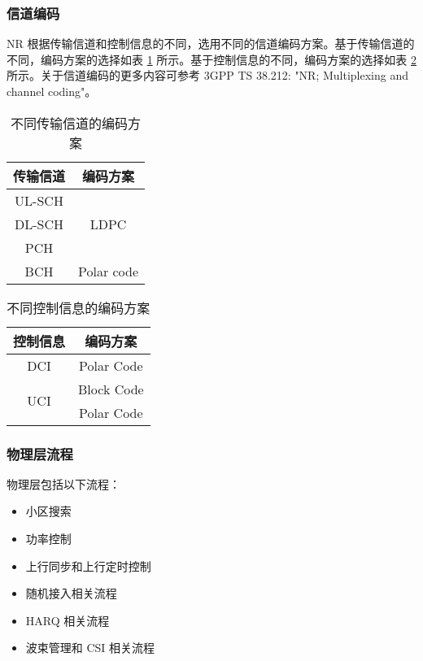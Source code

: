 \documentclass[cn,hazy,blue,14pt,screen,device=normal]{elegantnote}
\begin{document}
\subsubsection{信道编码}
NR 根据传输信道和控制信息的不同，选用不同的信道编码方案。基于传输信道的不同，编码方案的选择如表 \ref{ChannelCodingBasedOnTrCHs} 所示。基于控制信息的不同，编码方案的选择如表 \ref{ChannelCodingBasedOnControlInfo} 所示。关于信道编码的更多内容可参考 3GPP TS 38.212: "NR; Multiplexing and channel coding"。

\begin{table}[!hbp]
	\centering
	\setlength{\tabcolsep}{25mm}
	\begin{tabular}{|c|c|}
	\hline
	传输信道   & 编码方案                  \\ \hline
	UL-SCH & \multirow{3}{*}{LDPC} \\ \cline{1-1}
	DL-SCH &                       \\ \cline{1-1}
	PCH    &                       \\ \hline
	BCH    & Polar code            \\ \hline
	\end{tabular}
	\caption{ 不同传输信道的编码方案 }
	\label{ChannelCodingBasedOnTrCHs}
\end{table}

\begin{table}[!hbp]
	\centering
	\setlength{\tabcolsep}{25mm}
	\begin{tabular}{|c|c|}
	\hline
	控制信息                 & 编码方案       \\ \hline
	DCI                  & Polar Code \\ \hline
	\multirow{2}{*}{UCI} & Block Code \\ \cline{2-2} 
                     & Polar Code \\ \hline
	\end{tabular}
	\caption{ 不同控制信息的编码方案 }
	\label{ChannelCodingBasedOnControlInfo}
\end{table}


\subsubsection{物理层流程}
物理层包括以下流程：
\begin{itemize}[leftmargin=2cm]
	\item 小区搜索
	\item 功率控制
	\item 上行同步和上行定时控制
	\item 随机接入相关流程
	\item HARQ 相关流程
	\item 波束管理和 CSI 相关流程
\end{itemize}
\end{document}
